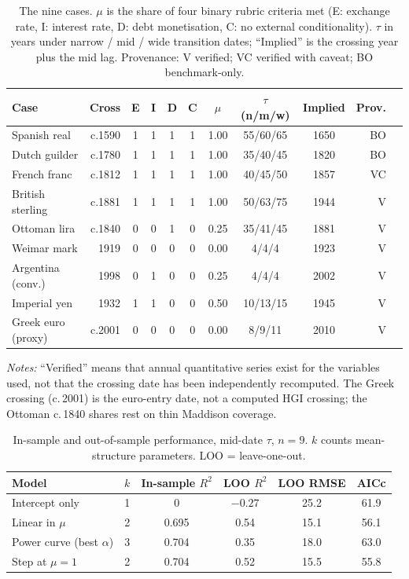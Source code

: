 \documentclass[11pt,letterpaper]{article}
\theoremstyle{definition}
\theoremstyle{plain}
\begin{document}
\begin{table}[H]\centering\small\setlength{\tabcolsep}{4pt}
\caption{The nine cases. $\mu$ is the share of four binary rubric criteria met (E: exchange rate, I: interest rate, D: debt monetisation, C: no external conditionality). $\tau$ in years under narrow / mid / wide transition dates; ``Implied'' is the crossing year plus the mid lag. Provenance: V verified; VC verified with caveat; BO benchmark-only.}\label{tab:cases}
\begin{tabular}{@{}lrcccccccrc@{}}
\toprule
Case & Cross & E & I & D & C & $\mu$ & $\tau$ (n/m/w) & Implied & Prov.\\\midrule
Spanish real & c.1590 & 1&1&1&1 & 1.00 & 55/60/65 & 1650 & BO\\
Dutch guilder & c.1780 & 1&1&1&1 & 1.00 & 35/40/45 & 1820 & BO\\
French franc & c.1812 & 1&1&1&1 & 1.00 & 40/45/50 & 1857 & VC\\
British sterling & c.1881 & 1&1&1&1 & 1.00 & 50/63/75 & 1944 & V\\
Ottoman lira & c.1840 & 0&0&1&0 & 0.25 & 35/41/45 & 1881 & V\\
Weimar mark & 1919 & 0&0&0&0 & 0.00 & 4/4/4 & 1923 & V\\
Argentina (conv.) & 1998 & 0&1&0&0 & 0.25 & 4/4/4 & 2002 & V\\
Imperial yen & 1932 & 1&1&0&0 & 0.50 & 10/13/15 & 1945 & V\\
Greek euro (proxy) & c.2001 & 0&0&0&0 & 0.00 & 8/9/11 & 2010 & V\\\bottomrule
\end{tabular}
\par\smallskip\footnotesize\emph{Notes:} ``Verified'' means that annual quantitative series exist for the variables used, not that the crossing date has been independently recomputed. The Greek crossing (c.\,2001) is the euro-entry date, not a computed HGI crossing; the Ottoman c.\,1840 shares rest on thin Maddison coverage.
\end{table}

\begin{table}[H]\centering\small
\caption{In-sample and out-of-sample performance, mid-date $\tau$, $n=9$. $k$ counts mean-structure parameters. LOO = leave-one-out.}\label{tab:models}
\begin{tabular}{@{}lccccc@{}}\toprule
Model & $k$ & In-sample $R^2$ & LOO $R^2$ & LOO RMSE & AICc\\\midrule
Intercept only & 1 & 0 & $-0.27$ & 25.2 & 61.9\\
Linear in $\mu$ & 2 & 0.695 & 0.54 & 15.1 & 56.1\\
Power curve (best $\alpha$) & 3 & 0.704 & 0.35 & 18.0 & 63.0\\
Step at $\mu=1$ & 2 & 0.704 & 0.52 & 15.5 & 55.8\\\bottomrule
\end{tabular}
\end{table}
\end{document}
